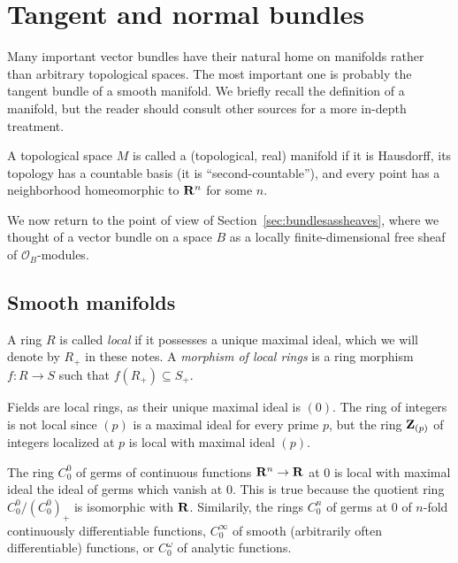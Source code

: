 \documentclass[a4paper,openany]{scrbook}
\begin{document}
\section{Tangent and normal bundles}

Many important vector bundles have their natural home on manifolds rather than arbitrary topological spaces. The most important one is probably the tangent bundle of a smooth manifold. We briefly recall the definition of a manifold, but the reader should consult other sources for a more in-depth treatment.

\begin{defn}
A topological space $M$ is called a (topological, real) manifold if it is Hausdorff, its topology has a countable basis (it is ``second-countable''), and every point has a neighborhood homeomorphic to $\mathbf R^n$ for some $n$.
\end{defn}

We now return to the point of view of Section~\ref{sec:bundlesassheaves}, where we thought of a vector bundle on a space $B$ as a locally finite-dimensional free sheaf of $\mathcal O_B$-modules.

\subsection{Smooth manifolds}

\begin{defn}
A ring $R$ is called \emph{local} if it possesses a unique maximal ideal, which we will denote by $R_+$ in these notes. A \emph{morphism of local rings} is a ring morphism $f\colon R \to S$ such that $f(R_+) \subseteq S_+$.
\end{defn}

\begin{example}
Fields are local rings, as their unique maximal ideal is $(0)$. The ring of integers is not local since $(p)$ is a maximal ideal for every prime $p$, but the ring $\mathbf Z_{(p)}$ of integers localized at $p$ is local with maximal ideal $(p)$. 

The ring $C^0_0$ of germs of continuous functions $\mathbf R^n \to \mathbf R$ at $0$ is local with maximal ideal the ideal of germs which vanish at $0$. This is true because the quotient ring $C^0_0/(C^0_0)_+$ is isomorphic with $\mathbf R$. Similarily, the rings $C^n_0$ of germs at $0$ of $n$-fold continuously differentiable functions, $C^\infty_0$ of smooth (arbitrarily often differentiable) functions, or $C^\omega_0$ of analytic functions.
\end{example}
\end{document}
